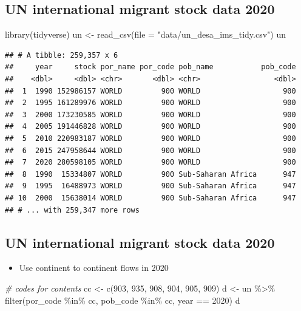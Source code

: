 \documentclass[
]{book}
\newenvironment{Shaded}{\begin{snugshade}}{\end{snugshade}}
\newcommand{\AttributeTok}[1]{\textcolor[rgb]{0.77,0.63,0.00}{#1}}
\newcommand{\CommentTok}[1]{\textcolor[rgb]{0.56,0.35,0.01}{\textit{#1}}}
\newcommand{\DecValTok}[1]{\textcolor[rgb]{0.00,0.00,0.81}{#1}}
\newcommand{\FunctionTok}[1]{\textcolor[rgb]{0.00,0.00,0.00}{#1}}
\newcommand{\NormalTok}[1]{#1}
\newcommand{\OtherTok}[1]{\textcolor[rgb]{0.56,0.35,0.01}{#1}}
\newcommand{\SpecialCharTok}[1]{\textcolor[rgb]{0.00,0.00,0.00}{#1}}
\newcommand{\StringTok}[1]{\textcolor[rgb]{0.31,0.60,0.02}{#1}}
\providecommand{\tightlist}{%
  \setlength{\itemsep}{0pt}\setlength{\parskip}{0pt}}
\begin{document}
\hypertarget{un-international-migrant-stock-data-2020}{%
\subsection{UN international migrant stock data 2020}\label{un-international-migrant-stock-data-2020}}

\begin{Shaded}
\begin{Highlighting}[]
\FunctionTok{library}\NormalTok{(tidyverse)}
\NormalTok{un }\OtherTok{\textless{}{-}} \FunctionTok{read\_csv}\NormalTok{(}\AttributeTok{file =} \StringTok{"data/un\_desa\_ims\_tidy.csv"}\NormalTok{)}
\NormalTok{un}
\end{Highlighting}
\end{Shaded}

\begin{verbatim}
## # A tibble: 259,357 x 6
##     year     stock por_name por_code pob_name           pob_code
##    <dbl>     <dbl> <chr>       <dbl> <chr>                 <dbl>
##  1  1990 152986157 WORLD         900 WORLD                   900
##  2  1995 161289976 WORLD         900 WORLD                   900
##  3  2000 173230585 WORLD         900 WORLD                   900
##  4  2005 191446828 WORLD         900 WORLD                   900
##  5  2010 220983187 WORLD         900 WORLD                   900
##  6  2015 247958644 WORLD         900 WORLD                   900
##  7  2020 280598105 WORLD         900 WORLD                   900
##  8  1990  15334807 WORLD         900 Sub-Saharan Africa      947
##  9  1995  16488973 WORLD         900 Sub-Saharan Africa      947
## 10  2000  15638014 WORLD         900 Sub-Saharan Africa      947
## # ... with 259,347 more rows
\end{verbatim}

\hypertarget{un-international-migrant-stock-data-2020-1}{%
\subsection{UN international migrant stock data 2020}\label{un-international-migrant-stock-data-2020-1}}

\begin{itemize}
\tightlist
\item
  Use continent to continent flows in 2020
\end{itemize}

\begin{Shaded}
\begin{Highlighting}[]
\CommentTok{\# codes for contents}
\NormalTok{cc }\OtherTok{\textless{}{-}} \FunctionTok{c}\NormalTok{(}\DecValTok{903}\NormalTok{, }\DecValTok{935}\NormalTok{, }\DecValTok{908}\NormalTok{, }\DecValTok{904}\NormalTok{, }\DecValTok{905}\NormalTok{, }\DecValTok{909}\NormalTok{)}
\NormalTok{d }\OtherTok{\textless{}{-}}\NormalTok{ un }\SpecialCharTok{\%\textgreater{}\%}
  \FunctionTok{filter}\NormalTok{(por\_code }\SpecialCharTok{\%in\%}\NormalTok{ cc, }
\NormalTok{         pob\_code }\SpecialCharTok{\%in\%}\NormalTok{ cc,}
\NormalTok{         year }\SpecialCharTok{==} \DecValTok{2020}\NormalTok{)}
\NormalTok{d}
\end{Highlighting}
\end{Shaded}
\end{document}
